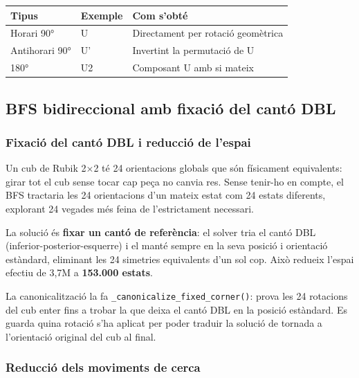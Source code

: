 \documentclass[12pt, a4paper]{article}
\begin{document}
\begin{center}
\begin{tabular}{lll}
  \toprule
  \textbf{Tipus} & \textbf{Exemple} & \textbf{Com s'obté} \\
  \midrule
  Horari 90°     & U       & Directament per rotació geomètrica \\
  Antihorari 90° & U'      & Invertint la permutació de U \\
  180°           & U2      & Composant U amb si mateix \\
  \bottomrule
\end{tabular}
\end{center}

\subsection{BFS bidireccional amb fixació del cantó DBL}

\subsubsection{Fixació del cantó DBL i reducció de l'espai}

Un cub de Rubik 2$\times$2 té 24 orientacions globals que són físicament equivalents: girar tot el cub sense tocar cap peça no canvia res. Sense tenir-ho en compte, el BFS tractaria les 24 orientacions d'un mateix estat com 24 estats diferents, explorant 24 vegades més feina de l'estrictament necessari.

La solució és \textbf{fixar un cantó de referència}: el solver tria el cantó DBL (inferior-posterior-esquerre) i el manté sempre en la seva posició i orientació estàndard, eliminant les 24 simetries equivalents d'un sol cop. Això redueix l'espai efectiu de 3,7M a \textbf{153.000 estats}.

La canonicalització la fa \texttt{\_canonicalize\_fixed\_corner()}: prova les 24 rotacions del cub enter fins a trobar la que deixa el cantó DBL en la posició estàndard. Es guarda quina rotació s'ha aplicat per poder traduir la solució de tornada a l'orientació original del cub al final.

\subsubsection{Reducció dels moviments de cerca}
\end{document}
